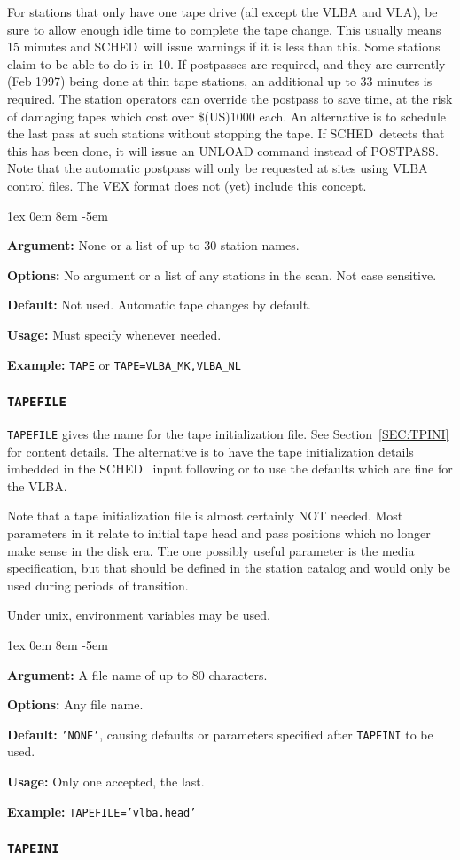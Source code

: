 \documentclass{report}
\newcommand{\schedb}{{\sc SCHED~}}
\newcommand{\rcwbox}[5]{
  \begin{list}{}{\parsep 1ex  \itemsep 0em
                 \leftmargin 8em  \itemindent -5em }
    \item {\bf Argument:} #1
    \item {\bf Options:}  #2
    \item {\bf Default:}  #3
    \item {\bf Usage:}    #4
    \item {\bf Example:}  #5
  \end{list}
}
\begin{document}
For stations that only have one tape drive (all except the VLBA and
VLA), be sure to allow enough idle time to complete the tape
change.  This usually means 15 minutes and \schedb will issue
warnings if it is less than this.  Some stations claim to be able
to do it in 10.  If postpasses are required, and they are currently
(Feb 1997) being done at thin tape stations, an additional up to
33 minutes is required.  The station operators can override the
postpass to save time, at the risk of damaging tapes which cost
over \$(US)1000 each.  An alternative is to schedule the last pass
at such stations without stopping the tape.  If \schedb detects
that this has been done, it will issue an UNLOAD command instead
of POSTPASS.  Note that the automatic postpass will only be
requested at sites using VLBA control files.  The VEX format does
not (yet) include this concept.

\rcwbox
{None or a list of up to 30 station names.}
{No argument or a list of any stations in the scan. Not case sensitive.}
{Not used. Automatic tape changes by default.}
{Must specify whenever needed.}
{{\tt TAPE} or {\tt TAPE=VLBA\_MK,VLBA\_NL}}


\subsubsection{\label{MP:TAPEFILE}{\tt TAPEFILE}}

{\tt TAPEFILE} gives the name for the tape initialization file. See
Section~\ref{SEC:TPINI} for content details.  The alternative is
to have the tape initialization details imbedded in the \schedb
input following  or to use the defaults
which are fine for the VLBA.

Note that a tape initialization file is almost certainly NOT needed.
Most parameters in it relate to initial tape head and pass positions
which no longer make sense in the disk era.  The one possibly useful
parameter is the media specification, but that should be defined in
the station catalog and would only be used during periods of transition.

Under unix, environment variables may be used.

\rcwbox
{A file name of up to 80 characters.}
{Any file name.}
{{\tt 'NONE'}, causing defaults or parameters specified after
{\tt TAPEINI} to be used.}
{Only one accepted, the last.}
{{\tt TAPEFILE='vlba.head'}}


\subsubsection{\label{MP:TAPEINI}{\tt TAPEINI}}
\end{document}
